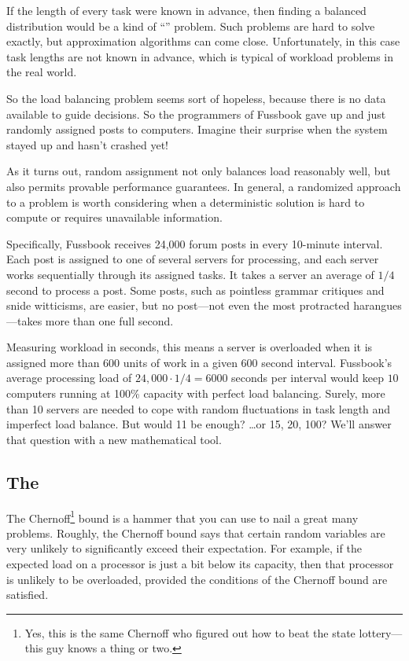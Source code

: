 If the length of every task were known in advance, then finding a
balanced distribution would be a kind of ``''
problem.  Such problems are hard to solve exactly, but approximation
algorithms can come close.  Unfortunately, in this case task lengths
are not known in advance, which is typical of workload problems in the
real world.

So the load balancing problem seems sort of hopeless, because there is
no data available to guide decisions.  So the programmers of Fussbook
gave up and just randomly assigned posts to computers.  Imagine their
surprise when the system stayed up and hasn't crashed yet!

As it turns out, random assignment not only balances load reasonably
well, but also permits provable performance guarantees.  In general,
a randomized approach to a problem is worth considering when a
deterministic solution is hard to compute or requires unavailable
information.

Specifically, Fussbook receives 24,000 forum posts in every 10-minute
interval.  Each post is assigned to one of several servers for
processing, and each server works sequentially through its assigned
tasks.  It takes a server an average of $1/4$ second to process a
post.  Some posts, such as pointless grammar critiques and snide
witticisms, are easier, but no post---not even the most protracted
harangues---takes more than one full second.

Measuring workload in seconds, this means a server is overloaded when
it is assigned more than 600 units of work in a given 600 second
interval.  Fussbook's average processing load of $24{,}000 \cdot 1/4 =
6000$ seconds per interval would keep $10$ computers running at 100\%
capacity with perfect load balancing.  Surely, more than 10 servers
are needed to cope with random fluctuations in task length and
imperfect load balance.  But would 11 be enough? \dots or 15, 20, 100?
We'll answer that question with a new mathematical tool.

\subsection{The }\label{chernoff_sec}

The Chernoff\footnote{Yes, this is the same Chernoff who figured out
  how to beat the state lottery---this guy knows a thing or two.}
bound is a hammer that you can use to nail a great many problems.
Roughly, the Chernoff bound says that certain random variables are
very unlikely to significantly exceed their expectation.  For example,
if the expected load on a processor is just a bit below its capacity,
then that processor is unlikely to be overloaded, provided the
conditions of the Chernoff bound are satisfied.

